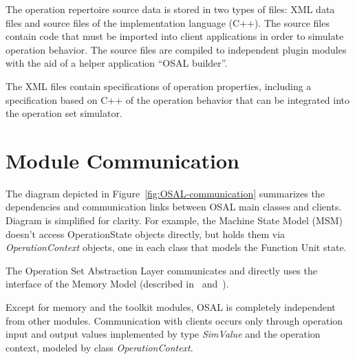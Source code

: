 \documentclass[a4paper,twoside]{tce}
\begin{document}

The operation repertoire source data is stored in two types of files: XML
data files and source files of the implementation language (C++).  The
source files contain code that must be imported into client applications in
order to simulate operation behavior.  The source files are compiled to
independent plugin modules with the aid of a helper application ``OSAL
builder''.

The XML files contain specifications of operation properties, including a
specification based on C++ of the operation behavior that can be integrated
into the operation set simulator.





\section{Module Communication}

The diagram depicted in Figure~\ref{fig:OSAL-communication} summarizes the
dependencies and communication links between OSAL main classes and clients.
Diagram is simplified for clarity.  For example, the Machine State Model
(MSM) doesn't access OperationState objects directly, but holds them via
\emph{OperationContext} objects, one in each class that models the Function
Unit state.

The Operation Set Abstraction Layer communicates and directly uses the
interface of the Memory Model (described in~\cite{MemoryModuleDesign}
and~\cite{SimulatorSpecs}).

Except for memory and the toolkit modules, OSAL is completely independent
from other modules. Communication with clients occurs only through operation
input and output values implemented by type \emph{SimValue} and the
operation context, modeled by class \emph{OperationContext}.
\end{document}
